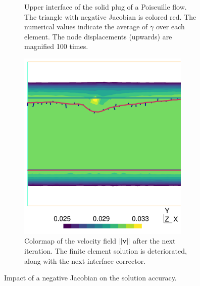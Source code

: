 \documentclass[11 pt]{report}
\begin{document}
\begin{figure}
    \centering
    \begin{subfigure}[t]{0.55\textwidth}
        \centering
        
        \caption{Upper interface of the solid plug of a Poiseuille flow. The triangle with negative Jacobian is colored red. The numerical values indicate the average of $\dot\gamma$ over each element. The node displacements (upwards) are magnified 100 times.}
    \end{subfigure}\vspace{6pt}
    \begin{subfigure}[t]{0.55\textwidth}
        \centering
        \includegraphics[width=0.90\textwidth]{../figures/negative_2.pdf}
        \caption{Colormap of the velocity field $\|\mathbf{v}\|$ after the next iteration. The finite element solution is deteriorated, along with the next interface corrector.}
    \end{subfigure}\vspace{6pt}
    \caption{Impact of a negative Jacobian on the solution accuracy.}
    \label{fig:failureNegative}
\end{figure}
\end{document}
